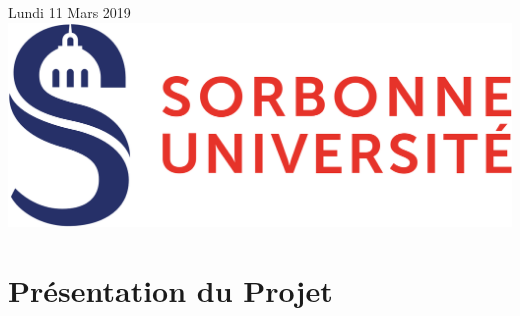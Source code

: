 \documentclass{article}
\begin{document}
\begin{titlepage}

{\large Lundi 11 Mars 2019}\\[3cm] %


\includegraphics[scale=0.15]{logo_sorbonne.png} %
 

\vfill %

\end{titlepage}

\newpage
\renewcommand{\contentsname}{\center{Table des Matières}\vspace*{5cm}}

\tableofcontents



\newpage
\section{Présentation du Projet}
\end{document}
